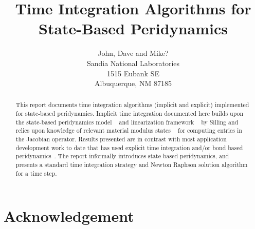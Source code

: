 \documentclass[pdf,ps2pdf,12pt]{SANDreport}
\title{
Time Integration Algorithms for State-Based Peridynamics
}
\author{John, Dave and Mike?\\
Sandia National Laboratories \\
1515 Eubank SE \\
Albuquerque, NM 87185
}
\date{}
\begin{document}
    \maketitle

    \begin{abstract}
    This report documents time integration algorithms (implicit and explicit) implemented for state-based peridynamics.  Implicit time integration documented here builds upon the state-based peridynamics model ~\cite{ref:pdStates.Silling} and linearization framework ~\cite{ref:pdLinearization.Silling} by Silling and relies upon knowledge of relevant material modulus states ~\cite{ref:statePlasticityMitchell} for computing entries in the Jacobian operator.    Results presented are in contrast with most application development work to date that has used explicit time integration and/or bond based peridynamics~\cite{ref:pdOriginal.Silling}.  The report informally introduces state based peridynamics, and presents a standard time integration strategy and Newton Raphson solution algorithm for a time step.  
    \end{abstract}


    \clearpage
    \section*{Acknowledgement}

\noindent

    \clearpage
    \tableofcontents
    \listoffigures
    \listoftables

    \SANDmain		%
\end{document}
